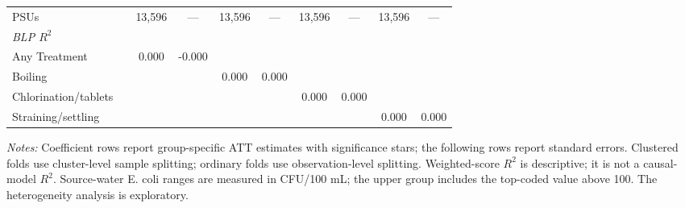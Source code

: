 \begin{landscape}
\begin{table}[p]
\begin{adjustbox}{max width=\linewidth, center}
\begin{tabular}{llcccccccc}
\quad PSUs &  & 13,596 & --- & 13,596 & --- & 13,596 & --- & 13,596 & --- \\
\multicolumn{10}{l}{\textit{BLP $R^{2}$}} \\
\quad Any Treatment &  & 0.000 & -0.000 &  &  &  &  &  &  \\
\quad Boiling &  &  &  & 0.000 & 0.000 &  &  &  &  \\
\quad Chlorination/tablets &  &  &  &  &  & 0.000 & 0.000 &  &  \\
\quad Straining/settling &  &  &  &  &  &  &  & 0.000 & 0.000 \\
\bottomrule
\end{tabular}
\end{adjustbox}
\par\vspace{3pt}
\begin{minipage}{\linewidth}\footnotesize \textit{Notes:} Coefficient rows report group-specific ATT estimates with significance stars; the following rows report standard errors. Clustered folds use cluster-level sample splitting; ordinary folds use observation-level splitting. Weighted-score $R^2$ is descriptive; it is not a causal-model $R^2$. Source-water E. coli ranges are measured in CFU/100 mL; the upper group includes the top-coded value above 100. The heterogeneity analysis is exploratory.\end{minipage}
\end{table}
\end{landscape}